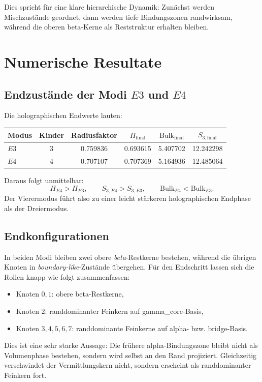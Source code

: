 \documentclass[11pt,a4paper]{article}
\theoremstyle{definition}
\theoremstyle{remark}
\begin{document}
	Dies spricht für eine klare hierarchische Dynamik: Zunächst werden Mischzustände geordnet, dann werden tiefe Bindungszonen randwirksam, während die oberen beta-Kerne als Reststruktur erhalten bleiben.
	
	\section{Numerische Resultate}
	\subsection{Endzustände der Modi $E3$ und $E4$}
	Die holographischen Endwerte lauten:
	\begin{center}
		\begin{tabular}{lccccc}
			\toprule
			Modus & Kinder & Radiusfaktor & $H_{\mathrm{final}}$ & $\mathrm{Bulk}_{\mathrm{final}}$ & $S_{3,\mathrm{final}}$ \\
			\midrule
			$E3$ & 3 & 0.759836 & 0.693615 & 5.407702 & 12.242298 \\
			$E4$ & 4 & 0.707107 & 0.707369 & 5.164936 & 12.485064 \\
			\bottomrule
		\end{tabular}
	\end{center}
	
	Daraus folgt unmittelbar:
	\[
	H_{E4}>H_{E3},\qquad S_{3,E4}>S_{3,E3},\qquad \mathrm{Bulk}_{E4}<\mathrm{Bulk}_{E3}.
	\]
	Der Vierermodus führt also zu einer leicht stärkeren holographischen Endphase als der Dreiermodus.
	
	\subsection{Endkonfigurationen}
	In beiden Modi bleiben zwei obere \emph{beta}-Restkerne bestehen, während die übrigen Knoten in \emph{boundary-like}-Zustände übergehen. Für den Endschritt lassen sich die Rollen knapp wie folgt zusammenfassen:
	\begin{itemize}[leftmargin=2em]
		\item Knoten $0,1$: obere beta-Restkerne,
		\item Knoten $2$: randdominanter Feinkern auf gamma\_core-Basis,
		\item Knoten $3,4,5,6,7$: randdominante Feinkerne auf alpha- bzw. bridge-Basis.
	\end{itemize}
	
	Dies ist eine sehr starke Aussage: Die frühere alpha-Bindungszone bleibt nicht als Volumenphase bestehen, sondern wird selbst an den Rand projiziert. Gleichzeitig verschwindet der Vermittlungskern nicht, sondern erscheint als randdominanter Feinkern fort.
	
\end{document}
